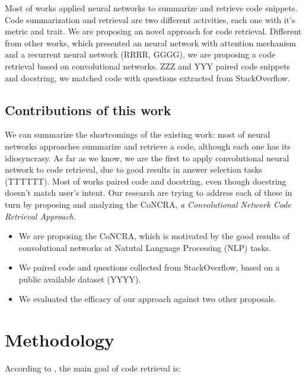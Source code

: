 \documentclass[sigconf]{acmart}
\begin{document}
Most of works applied neural networks to summarize and retrieve code snippets. Code summarization and retrieval are two different activities, each one with it's metric and trait. We are proposing an novel approach for code retrieval. Different from other works, which presented an neural network with attention mechanism and a recurrent neural network (RRRR, GGGG), we are proposing a code retrieval based on convolutional networks. ZZZ and YYY paired code snippets and docstring, we matched code with questions extracted from StackOverflow.

\subsection{Contributions of this work}

We can summarize the shortcomings of the existing work:
most of neural networks approaches summarize and retrieve a code, although each one has its idiosyncrasy. As far as we know, we are the first to apply convolutional neural network to code retrieval, due to good results in answer selection tasks (TTTTTT). Most of works paired code and docstring, even though docstring doesn't match user's intent. Our research are trying to address each of these in turn by proposing and analyzing the CoNCRA, \emph{a Convolutional Network Code Retrieval Approach}.

\begin{itemize}
    \item We are proposing the CoNCRA, which is motivated
by the good results of convolutional networks at Natutal Language Processing (NLP) tasks. 
    \item We paired code and questions collected from StackOverflow, based on a public available dataset (YYYY).

    \item We evaluated the efficacy of our approach against two other proposals.
    
\end{itemize}







\section{Methodology}
\label{sec:methodology}

According to \cite{cambronero-deep-code-search-2019}, the main goal of code retrieval is:
\end{document}

